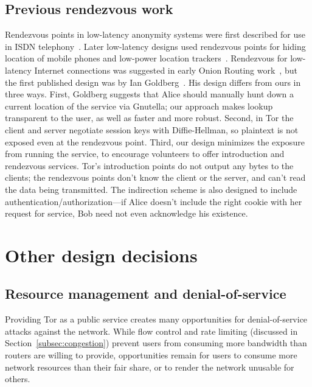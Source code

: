 \documentclass[twocolumn]{article}
\begin{document}
\subsection{Previous rendezvous work}

Rendezvous points in low-latency anonymity systems were first
described for use in ISDN telephony~\cite{jerichow-jsac98,isdn-mixes}.
Later low-latency designs used rendezvous points for hiding location
of mobile phones and low-power location
trackers~\cite{federrath-ih96,reed-protocols97}.  Rendezvous for
low-latency
Internet connections was suggested in early Onion Routing
work~\cite{or-ih96}, but the first published design was by Ian
Goldberg~\cite{ian-thesis}. His design differs from
ours in three ways. First, Goldberg suggests that Alice should manually
hunt down a current location of the service via Gnutella; our approach
makes lookup transparent to the user, as well as faster and more robust.
Second, in Tor the client and server negotiate session keys
with Diffie-Hellman, so plaintext is not exposed even at the rendezvous
point. Third,
our design minimizes the exposure from running the
service, to encourage volunteers to offer introduction and rendezvous
services. Tor's introduction points do not output any bytes to the
clients; the rendezvous points don't know the client or the server,
and can't read the data being transmitted. The indirection scheme is
also designed to include authentication/authorization---if Alice doesn't
include the right cookie with her request for service, Bob need not even
acknowledge his existence.

\section{Other design decisions}
\label{sec:other-design}

\subsection{Resource management and denial-of-service}
\label{subsec:dos}

Providing Tor as a public service creates many opportunities for
denial-of-service attacks against the network.  While
flow control and rate limiting (discussed in
Section~\ref{subsec:congestion}) prevent users from consuming more
bandwidth than routers are willing to provide, opportunities remain for
users to
consume more network resources than their fair share, or to render the
network unusable for others.
\end{document}
